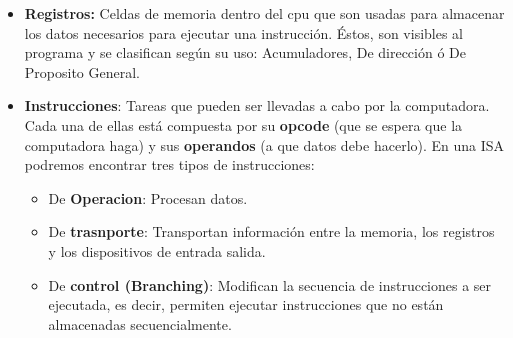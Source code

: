\begin{itemize}
	\item \textbf{Registros:} Celdas de memoria dentro del cpu que son usadas para almacenar los datos necesarios para ejecutar una instrucción. Éstos, son visibles al programa y se clasifican según su uso: Acumuladores, De dirección ó De Proposito General.
	\item  \textbf{Instrucciones}: Tareas que pueden ser llevadas a cabo por la computadora. Cada una de ellas está compuesta por su \textbf{opcode} (que se espera que la computadora haga) y sus \textbf{operandos} (a que datos debe hacerlo). En una ISA podremos encontrar tres tipos de instrucciones:
	\begin{itemize}
		\item De \textbf{Operacion}: Procesan datos.
		\item De \textbf{trasnporte}: Transportan información entre la memoria, los registros y los dispositivos de entrada salida.
		\item De \textbf{control (Branching)}: Modifican la secuencia de instrucciones a ser ejecutada, es decir, permiten ejecutar instrucciones que no están almacenadas secuencialmente.
	\end{itemize}
	

\end{itemize}
